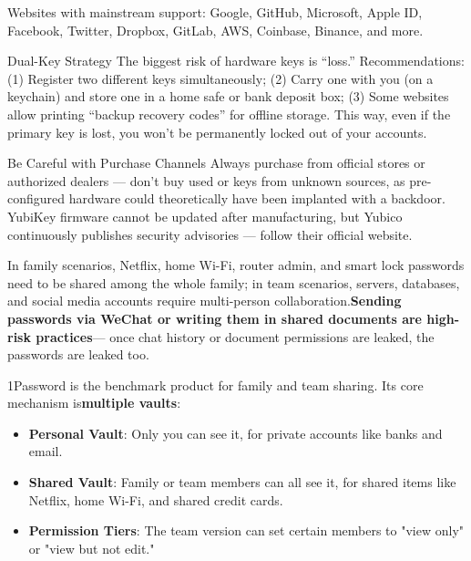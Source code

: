 Websites with mainstream support: Google, GitHub, Microsoft, Apple ID, Facebook, Twitter, Dropbox, GitLab, AWS, Coinbase, Binance, and more.

\begin{tcbinfo}{Dual-Key Strategy}
The biggest risk of hardware keys is “loss.” Recommendations: (1) Register two different keys simultaneously; (2) Carry one with you (on a keychain) and store one in a home safe or bank deposit box; (3) Some websites allow printing “backup recovery codes” for offline storage. This way, even if the primary key is lost, you won't be permanently locked out of your accounts.

\end{tcbinfo}

\begin{tcbwarn}{Be Careful with Purchase Channels}
Always purchase from official stores or authorized dealers — don't buy used or keys from unknown sources, as pre-configured hardware could theoretically have been implanted with a backdoor. YubiKey firmware cannot be updated after manufacturing, but Yubico continuously publishes security advisories — follow their official website.

\end{tcbwarn}


In family scenarios, Netflix, home Wi-Fi, router admin, and smart lock passwords need to be shared among the whole family; in team scenarios, servers, databases, and social media accounts require multi-person collaboration.\textbf{Sending passwords via WeChat or writing them in shared documents are high-risk practices}— once chat history or document permissions are leaked, the passwords are leaked too.


1Password is the benchmark product for family and team sharing. Its core mechanism is\textbf{multiple vaults}:

\begin{itemize}
  \item \textbf{Personal Vault}: Only you can see it, for private accounts like banks and email.
  \item \textbf{Shared Vault}: Family or team members can all see it, for shared items like Netflix, home Wi-Fi, and shared credit cards.
  \item \textbf{Permission Tiers}: The team version can set certain members to "view only" or "view but not edit."
\end{itemize}

